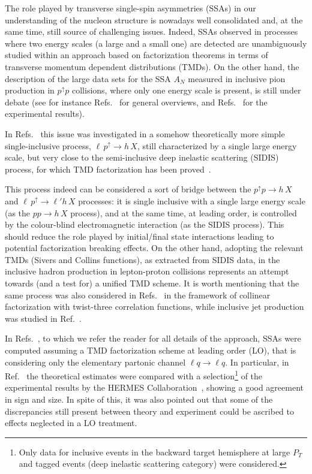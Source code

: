 \documentclass[nofootinbib,superscriptaddress,aps]{revtex4}
\newcommand{\pup}{p^\uparrow}
\begin{document}
The role played by transverse single-spin asymmetries (SSAs) in our understanding of the nucleon structure is nowadays well consolidated and, at the same time, still source of challenging issues. Indeed, SSAs observed in processes where two energy scales (a large and a small one) are detected are unambiguously studied within an approach based on factorization theorems in terms of transverse momentum dependent distributions (TMDs). On the other hand, the description of the large data sets for the SSA $A_N$ measured in inclusive pion production in $p^\uparrow p$ collisions, where only one energy scale is present, is still under debate (see for instance Refs.~\cite{D'Alesio:2007jt,Aschenauer:2015ndk} for general overviews, and Refs.~\cite{Adams:1991rw,Adams:1991cs,Adams:1991rv,Adams:1991ru,Adams:2003fx,Adler:2005in,Lee:2007zzh, Abelev:2008af,Adamczyk:2012xd,Igo:2012,Bland:2013pkt} for the experimental results).

In Refs.~\cite{Anselmino:2009pn,Anselmino:2014eza} this issue was investigated in a somehow theoretically more simple  single-inclusive process, $\ell \, \pup \to h \, X$,  still characterized by a single large energy scale, but very close to the semi-inclusive deep inelastic scattering (SIDIS) process, for which TMD factorization has been proved~\cite{Collins:2002kn, Collins:2004nx,Ji:2004wu, Ji:2004xq, Bacchetta:2008xw,Collins:2011zzd,GarciaEchevarria:2011rb,Echevarria:2014rua}.

This process indeed can be considered a sort of bridge between the $p^\uparrow p\to h\,X$ and $\ell\,p^\uparrow\to \ell' h\, X$ processes: it is single inclusive with a single large energy scale (as the $pp\to h\,X$ process), and at the same time, at leading order, is controlled by the colour-blind electromagnetic interaction (as the SIDIS process). This should reduce the role played by initial/final state interactions leading to potential factorization breaking effects. On the other hand, adopting the relevant TMDs (Sivers and Collins functions), as extracted from SIDIS data, in the inclusive hadron production in lepton-proton collisions represents an attempt towards (and a test for) a unified TMD scheme. It is worth mentioning that the same process was also considered in Refs.~\cite{Koike:2002gm,Gamberg:2014eia} in the framework of collinear factorization with twist-three correlation functions, while inclusive jet production was studied in Ref.~\cite{Kang:2011jw}.

In Refs.~\cite{Anselmino:2009pn,Anselmino:2014eza}, to which we refer the reader for all details of the approach,
SSAs were computed assuming a TMD factorization scheme at leading order (LO), that is considering only the elementary partonic channel $\ell q\to \ell q$.
In particular, in Ref.~\cite{Anselmino:2014eza} the theoretical estimates were compared with a selection\footnote{Only data for inclusive events in the backward target hemisphere at large $P_T$ and tagged events (deep inelastic scattering category) were considered.} of the experimental results by the HERMES Collaboration~\cite{Airapetian:2013bim}, showing a good agreement in sign and size. In spite of this, it was also pointed out that some of the discrepancies still present between theory and experiment could be ascribed to effects neglected in a LO treatment.
\end{document}
